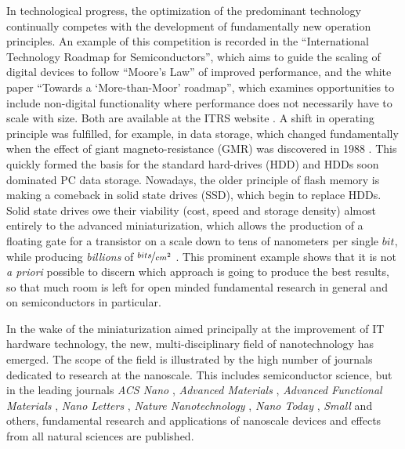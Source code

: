 



In technological progress, the optimization of the predominant technology continually competes with the development of fundamentally new operation principles. An example of this competition is recorded in the ``International Technology Roadmap for Semiconductors'', which aims to guide the scaling of digital devices to follow ``Moore's Law'' of improved performance, and the white paper ``Towards a `More-than-Moor' roadmap'', which examines opportunities to include non-digital functionality where performance does not necessarily have to scale with size. Both are available at the ITRS website  \cite{map_http://www.itrs.net/_2015}. A shift in operating principle was fulfilled, for example, in data storage, which changed fundamentally when the effect of giant magneto-resistance (GMR) was discovered in 1988 \cite{baibich_giant_1988,binasch_enhanced_1989}. This quickly formed the basis for the standard hard-drives (HDD) and HDDs soon dominated PC data storage. Nowadays, the older principle of flash memory is making a comeback in solid state drives (SSD), which begin to replace HDDs. Solid state drives owe their viability (cost, speed and storage density) almost entirely to the advanced miniaturization, which allows the production of a floating gate for a transistor on a scale down to tens of nanometers per single $bit$, while producing \emph{billions} of $\nicefrac{bits}{cm^{2}}$ \cite{micheloni_inside_2013}. This prominent example shows that it is not \emph{a priori} possible to discern which approach is going to produce the best results, so that much room is left for open minded fundamental research in general and on semiconductors in particular.

In the wake of the miniaturization aimed principally at the improvement of IT hardware technology, the new, multi-disciplinary field of nanotechnology has emerged. The scope of the field is illustrated by the high number of journals dedicated to research at the nanoscale. This includes semiconductor science, but in the leading journals \emph{ACS Nano} \cite{nano_http://pubs.acs.org/journal/ancac3_2015}, \emph{Advanced Materials} \cite{advanced_materials_http://www.advmat./_2015}, \emph{Advanced Functional Materials} \cite{advanced_functional_materials_http://onlinelibrary.wiley.com/journal/10.1002/issn1616-3028_2015}, \emph{Nano Letters} \cite{nano_letters_http://pubs.acs.org/journal/nalefd_2015}, \emph{Nature Nanotechnology} \cite{nature_nanotechnology_http://www.nature.com/nnano_2015}, \emph{Nano Today} \cite{nano_today_http://journals.elsevier.com/17480132/nano-today/_2015}, \emph{Small} \cite{small_http://www.small-journal.com/_2015} and others, fundamental research and applications of nanoscale devices and effects from all natural sciences are published.

